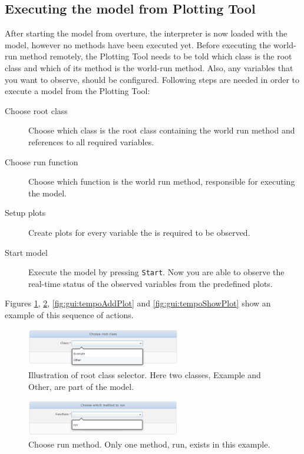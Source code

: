 \documentclass{overturerepchap}
\begin{document}
\subsection{Executing the model from Plotting Tool}
After starting the model from overture, the interpreter is now loaded with the model, however no methods have been executed yet. Before executing the world-run method remotely, the Plotting Tool needs to be told which class is the root class and which of its method is the world-run method. Also, any variables that you want to observe, should be configured. Following steps are needed in order to execute a model from the Plotting Tool:

\begin{description}
\item [Choose root class] Choose which class is the root class containing the world run method and references to all required variables. 
\item [Choose run function] Choose which function is the world run method, responsible for executing the model.
\item [Setup plots] Create plots for every variable the is required to be observed.  
\item [Start model] Execute the model by pressing \texttt{Start}. Now you are able to observe the real-time status of the observed variables from the predefined plots. 
\end{description}

Figures \ref{fig:gui:tempoChooseRoot}, \ref{fig:gui:tempoChooseRun}, \ref{fig:gui:tempoAddPlot} and \ref{fig:gui:tempoShowPlot} show an example of this sequence of actions.

\begin{figure}[!h]
\begin{center}
  \includegraphics[width=0.6\textwidth]{screenDumps/tempo_choose_root}
  \caption{Illustration of root class selector. Here two classes, Example and Other, are part of the model.}
  \label{fig:gui:tempoChooseRoot}
\end{center}
\end{figure}

\begin{figure}[!h]
\begin{center}
  \includegraphics[width=0.6\textwidth]{screenDumps/tempo_choose_run}
  \caption{Choose run method. Only one method, run, exists in this example.}
  \label{fig:gui:tempoChooseRun}
\end{center}
\end{figure}
\end{document}
